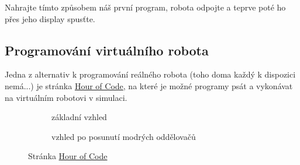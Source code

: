 \documentclass[../main.tex]{subfiles}
\begin{document}
	\begin{question}
		Nahrajte tímto způsobem náš první program, robota odpojte a teprve poté ho přes jeho display spusťte.
	\end{question}

	\subsection{Programování virtuálního robota}
	Jedna z alternativ k programování reálného robota (toho doma každý k dispozici nemá...) je stránka \href{http://www.robotmesh.com/create/176384}{Hour of Code}, na které je možné programy psát a vykonávat na virtuálním robotovi v simulaci.

	\begin{figure}[h!]%
		\begin{subfigure}{.49\textwidth}%
			\centering%
			\caption{základní vzhled}%
		\end{subfigure} \hspace{.05\textwidth}%
		\begin{subfigure}{.49\textwidth}%
			\centering%
			\caption{vzhled po posunutí modrých oddělovačů}%
		\end{subfigure}%
		\caption{Stránka \href{http://www.robotmesh.com/create/176384}{Hour of Code}}
	\end{figure}
\end{document}
